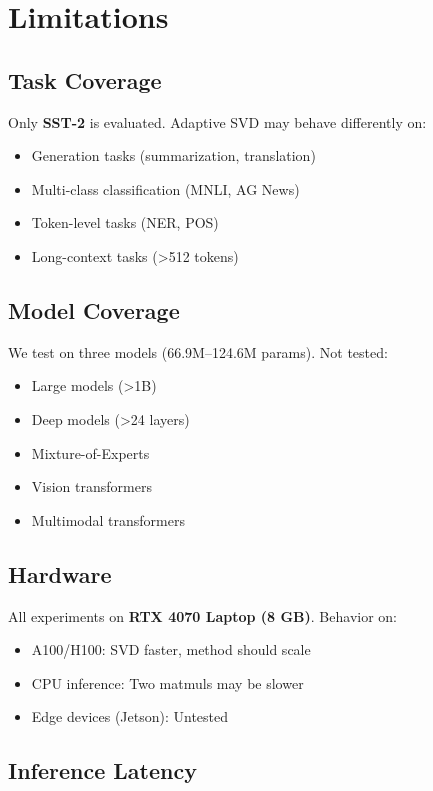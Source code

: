 
\section{Limitations}

\subsection{Task Coverage}

Only \textbf{SST-2} is evaluated. Adaptive SVD may behave differently on:
\begin{itemize}
\item Generation tasks (summarization, translation)
\item Multi-class classification (MNLI, AG News)
\item Token-level tasks (NER, POS)
\item Long-context tasks (>512 tokens)

\end{itemize}
\subsection{Model Coverage}

We test on three models (66.9M--124.6M params). Not tested:
\begin{itemize}
\item Large models (>1B)
\item Deep models (>24 layers)
\item Mixture-of-Experts
\item Vision transformers
\item Multimodal transformers

\end{itemize}
\subsection{Hardware}

All experiments on \textbf{RTX 4070 Laptop (8 GB)}. Behavior on:
\begin{itemize}
\item A100/H100: SVD faster, method should scale
\item CPU inference: Two matmuls may be slower
\item Edge devices (Jetson): Untested

\end{itemize}
\subsection{Inference Latency}

